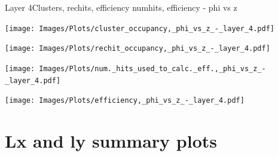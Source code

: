 \documentclass{beamer}
\begin{document}
\begin{frame}{Layer 4}{Clusters, rechits, efficiency numhits, efficiency - phi vs z}
  \hspace{0.01\textwidth}%
  \begin{minipage}{0.45\textwidth}
    \centering
    \texttt{[image: Images/Plots/cluster\_occupancy,\_phi\_vs\_z\_-\_layer\_4.pdf]}
  \end{minipage}%
  \hspace{0.01\textwidth}%
  \begin{minipage}{0.45\textwidth}
    \centering
    \texttt{[image: Images/Plots/rechit\_occupancy,\_phi\_vs\_z\_-\_layer\_4.pdf]}
  \end{minipage}
  \vspace*{0.2cm}
  \begin{minipage}{0.45\textwidth}
    \centering
    \texttt{[image: Images/Plots/num.\_hits\_used\_to\_calc.\_eff.,\_phi\_vs\_z\_-\_layer\_4.pdf]}
  \end{minipage}%
  \hspace{0.01\textwidth}%
  \begin{minipage}{0.45\textwidth}
    \centering
    \texttt{[image: Images/Plots/efficiency,\_phi\_vs\_z\_-\_layer\_4.pdf]}
  \end{minipage}
\end{frame}

\section{Lx and ly summary plots}
\end{document}

